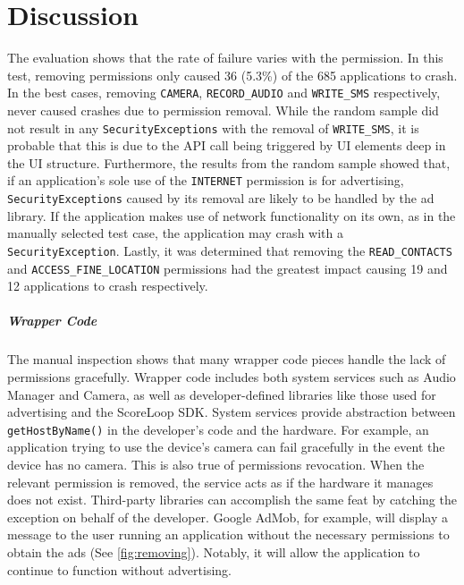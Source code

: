 \chapter{Discussion}
\label{sec:discussion}

The evaluation shows that the rate of failure varies with the permission.  In this test, removing permissions only caused 36 (5.3\%) of the 685 applications to crash.   In the best cases, removing \texttt{CAMERA}, \texttt{RECORD\_AUDIO} and \texttt{WRITE\_SMS} respectively, never caused crashes due to permission removal.  While the random sample did not result in any \texttt{SecurityExceptions} with the removal of \texttt{WRITE\_SMS}, it is probable that this is due to the API call being triggered by UI elements deep in the UI structure.  Furthermore, the results from the random sample showed that, if an application's sole use of the \texttt{INTERNET} permission is for advertising, \texttt{SecurityExceptions} caused by its removal are likely to be handled by the ad library.  If the application makes use of network functionality on its own, as in the manually selected test case, the application may crash with a \texttt{SecurityException}. Lastly, it was determined that removing the \texttt{READ\_CONTACTS} and \texttt{ACCESS\_FINE\_LOCATION} permissions had the greatest impact causing 19 and 12 applications to crash respectively.      

\paragraph{\bfseries Wrapper Code}
The manual inspection shows that many wrapper code pieces handle the lack of permissions gracefully.  Wrapper code includes both system services such as Audio Manager and Camera, as well as developer-defined libraries like those used for advertising and the ScoreLoop SDK.  System services provide abstraction between \texttt{getHostByName()} in the developer's code and the hardware.  For example, an application trying to use the device's camera can fail gracefully in the event the device has no camera.  This is also true of permissions revocation.  When the relevant permission is removed, the service acts as if the hardware it manages does not exist.  Third-party libraries can accomplish the same feat by catching the exception on behalf of the developer.  Google AdMob, for example, will display a message to the user running an application without the necessary permissions to obtain the ads (See \ref{fig:removing}).  Notably, it will allow the application to continue to function without advertising.  

